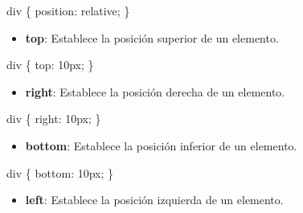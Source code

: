 \documentclass[
  a4paper,
  DIV=11,
  numbers=noendperiod,
  onepage,
  openany]{scrreprt}
\newenvironment{Shaded}{\begin{snugshade}}{\end{snugshade}}
\newcommand{\DataTypeTok}[1]{\textcolor[rgb]{0.68,0.00,0.00}{#1}}
\newcommand{\DecValTok}[1]{\textcolor[rgb]{0.68,0.00,0.00}{#1}}
\newcommand{\KeywordTok}[1]{\textcolor[rgb]{0.00,0.23,0.31}{#1}}
\newcommand{\NormalTok}[1]{\textcolor[rgb]{0.00,0.23,0.31}{#1}}
\newcommand{\OperatorTok}[1]{\textcolor[rgb]{0.37,0.37,0.37}{#1}}
\providecommand{\tightlist}{%
  \setlength{\itemsep}{0pt}\setlength{\parskip}{0pt}}\usepackage{longtable,booktabs,array}
\begin{document}
\begin{Shaded}
\begin{Highlighting}[]
\NormalTok{div \{}
  \KeywordTok{position}\NormalTok{: }\DecValTok{relative}\OperatorTok{;}
\NormalTok{\}}
\end{Highlighting}
\end{Shaded}

\begin{itemize}
\tightlist
\item
  \textbf{top}: Establece la posición superior de un elemento.
\end{itemize}

\begin{Shaded}
\begin{Highlighting}[]
\NormalTok{div \{}
  \KeywordTok{top}\NormalTok{: }\DecValTok{10}\DataTypeTok{px}\OperatorTok{;}
\NormalTok{\}}
\end{Highlighting}
\end{Shaded}

\begin{itemize}
\tightlist
\item
  \textbf{right}: Establece la posición derecha de un elemento.
\end{itemize}

\begin{Shaded}
\begin{Highlighting}[]
\NormalTok{div \{}
  \KeywordTok{right}\NormalTok{: }\DecValTok{10}\DataTypeTok{px}\OperatorTok{;}
\NormalTok{\}}
\end{Highlighting}
\end{Shaded}

\begin{itemize}
\tightlist
\item
  \textbf{bottom}: Establece la posición inferior de un elemento.
\end{itemize}

\begin{Shaded}
\begin{Highlighting}[]
\NormalTok{div \{}
  \KeywordTok{bottom}\NormalTok{: }\DecValTok{10}\DataTypeTok{px}\OperatorTok{;}
\NormalTok{\}}
\end{Highlighting}
\end{Shaded}

\begin{itemize}
\tightlist
\item
  \textbf{left}: Establece la posición izquierda de un elemento.
\end{itemize}
\end{document}

